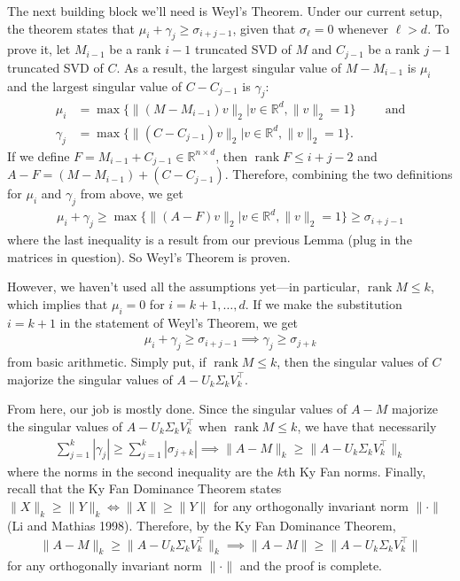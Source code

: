 \documentclass{letter}
\newcommand{\T}{\intercal}
\newcommand{\R}{\mathbb{R}}
\DeclareMathOperator{\rank}{rank}
\begin{document}
{    The next building block we'll need is Weyl's Theorem. Under our current setup, the theorem states that $\mu_i + \gamma_j \geq \sigma_{i+j-1}$, given that $\sigma_\ell = 0$ whenever $\ell > d$. To prove it, let $M_{i-1}$ be a rank $i-1$ truncated SVD of $M$ and $C_{j-1}$ be a rank $j-1$ truncated SVD of $C$. As a result, the largest singular value of $M - M_{i-1}$ is $\mu_i$ and the largest singular value of $C - C_{j-1}$ is $\gamma_j$: \begin{align*}
        \mu_i &= \max \{\|(M - M_{i-1})v\|_2 | v \in \R^d, \|v\|_2 = 1\} \hspace{1cm} \text{and}\\
        \gamma_j &= \max \{\|(C - C_{j-1})v\|_2 | v \in \R^d, \|v\|_2 = 1\}.
    \end{align*} If we define $F = M_{i-1} + C_{j-1} \in \R^{n\times d}$, then $\rank F \leq i + j - 2$ and $A - F = (M-M_{i-1}) + (C-C_{j-1})$. Therefore, combining the two definitions for $\mu_i$ and $\gamma_j$ from above, we get \begin{align*}
        \mu_i + \gamma_j \geq \max \{\|(A - F)v\|_2 | v\in\R^d, \|v\|_2 = 1\} \geq \sigma_{i + j - 1}
    \end{align*} where the last inequality is a result from our previous Lemma (plug in the matrices in question). So Weyl's Theorem is proven.
    
    However, we haven't used all the assumptions yet---in particular, $\rank M \leq k$, which implies that $\mu_i = 0$ for $i = k+1, \dots, d$. If we make the substitution $i = k + 1$ in the statement of Weyl's Theorem, we get \begin{align*}
        \mu_i + \gamma_j \geq \sigma_{i+j-1} \implies \gamma_j \geq \sigma_{j+k}
    \end{align*} from basic arithmetic. Simply put, if $\rank M \leq k$, then the singular values of $C$ majorize the singular values of $A - U_k\Sigma_kV_k^\T$.
    
    From here, our job is mostly done. Since the singular values of $A - M$ majorize the singular values of $A - U_k\Sigma_kV_k^\T$ when $\rank M \leq k$, we have that necessarily \begin{align*}
        \sum_{j=1}^k |\gamma_j| \geq \sum_{j=1}^k |\sigma_{j+k}| \implies \|A - M\|_k \geq \|A - U_k\Sigma_kV_k^\T\|_k
    \end{align*} where the norms in the second inequality are the $k$th Ky Fan norms. Finally, recall that the Ky Fan Dominance Theorem states $\|X\|_k \geq \|Y\|_k \iff \|X\| \geq \|Y\|$ for any orthogonally invariant norm $\| \cdot \|$ (Li and Mathias 1998). Therefore, by the Ky Fan Dominance Theorem, \begin{align*}
        \|A - M\|_k \geq \|A - U_k\Sigma_kV_k^\T\|_k \implies \|A - M\| \geq \|A - U_k\Sigma_kV_k^\T\|
    \end{align*} for any orthogonally invariant norm $\|\cdot\|$ and the proof is complete.
    
}
\end{document}
